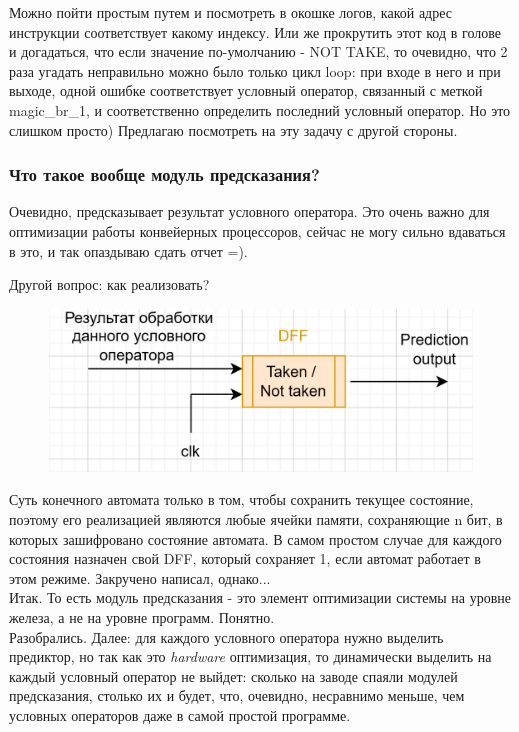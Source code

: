 Можно пойти простым путем и посмотреть в окошке логов, какой адрес инструкции соответствует какому индексу. Или же прокрутить этот код в голове и догадаться, что если значение по-умолчанию - NOT TAKE, то очевидно, что 2 раза угадать неправильно можно было только цикл loop: при входе в него и при выходе, одной ошибке соответствует условный оператор, связанный с меткой magic\_br\_1, и соответственно определить последний условный оператор. Но это слишком просто) Предлагаю посмотреть на эту задачу с другой стороны.

\subsubsection*{Что такое вообще модуль предсказания?}
Очевидно, предсказывает результат условного оператора. Это очень важно для оптимизации работы конвейерных процессоров, сейчас не могу сильно вдаваться в это, и так опаздываю сдать отчет =).

Другой вопрос: как реализовать?
\begin{figure}[H]
    \centering
    \includegraphics[width=0.75\linewidth]{Part1/predict.png}
\end{figure}
Суть конечного автомата только в том, чтобы сохранить текущее состояние, поэтому его реализацией являются любые ячейки памяти, сохраняющие n бит, в которых зашифровано состояние автомата. В самом простом случае для каждого состояния назначен свой DFF, который сохраняет 1, если автомат работает в этом режиме. Закручено написал, однако...\\

Итак. То есть модуль предсказания - это элемент оптимизации системы на уровне железа, а не на уровне программ. Понятно.\\

Разобрались. Далее: для каждого условного оператора нужно выделить предиктор, но так как это \textit{hardware} оптимизация, то динамически выделить на каждый условный оператор не выйдет: сколько на заводе спаяли модулей предсказания, столько их и будет, что, очевидно, несравнимо меньше, чем условных операторов даже в самой простой программе. 

